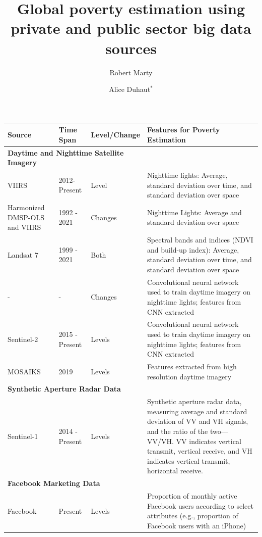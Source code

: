 \documentclass{article}
\title{Global poverty estimation using private and public sector big data sources}
\author[1]{Robert Marty}
\author[1]{Alice Duhaut$^{*}$}
\affil[1]{World Bank}
\begin{document}
\maketitle

\bigskip

\begin{table}
    \centering
    \small
    \begin{tabular}{p{2.2cm} ll p{7.0cm}}
    \hline
    Source & Time Span & Level/Change & Features for Poverty Estimation \\
    \hline
    \multicolumn{3}{l}{\bf Daytime and Nighttime Satellite Imagery} \\
    VIIRS & 2012-  Present & Level & Nighttime lights: Average, standard deviation over time, and standard deviation over space \\
    
    \addlinespace[1ex]
    Harmonized DMSP-OLS and VIIRS & 1992 - 2021 & Changes & Nighttime Lights: Average and standard deviation over space \\
    
    \addlinespace[1ex]
    Landsat 7 & 1999 - 2021 & Both & Spectral bands and indices (NDVI and build-up index): Average, standard deviation over time, and standard deviation over space \\
    
    \addlinespace[1ex]
    - & - & Changes & Convolutional neural network used to train daytime imagery on nighttime lights; features from CNN extracted \\
    
    \addlinespace[1ex]
    Sentinel-2 & 2015 - Present & Levels & Convolutional neural network used to train daytime imagery on nighttime lights; features from CNN extracted \\

    \addlinespace[1ex]
    \color{red}MOSAIKS & \color{red}2019 & \color{red}Levels & \color{red} Features extracted from high resolution daytime imagery \\
    \hline  
    \multicolumn{3}{l}{\bf Synthetic Aperture Radar Data} \\
    Sentinel-1 & 2014 - Present & Levels & Synthetic aperture radar data, measuring average and standard deviation of VV and VH signals, and the ratio of the two---VV/VH. VV indicates vertical transmit, vertical receive, and VH indicates vertical transmit, horizontal receive. \\
    
    \hline
    \multicolumn{3}{l}{\bf Facebook Marketing Data} \\
    Facebook & Present & Levels & Proportion of monthly active Facebook users according to select attributes (e.g., proportion of Facebook users with an iPhone) \\
    

\end{tabular}
\end{table}
\end{document}
